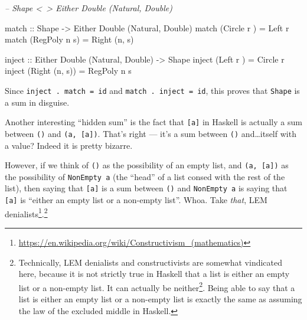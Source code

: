 \documentclass[]{article}
\newenvironment{Shaded}{}{}
\newcommand{\CommentTok}[1]{\textcolor[rgb]{0.38,0.63,0.69}{\textit{#1}}}
\newcommand{\DataTypeTok}[1]{\textcolor[rgb]{0.56,0.13,0.00}{#1}}
\newcommand{\FunctionTok}[1]{\textcolor[rgb]{0.02,0.16,0.49}{#1}}
\newcommand{\NormalTok}[1]{#1}
\newcommand{\OtherTok}[1]{\textcolor[rgb]{0.00,0.44,0.13}{#1}}
\renewcommand{\href}[2]{#2\footnote{\url{#1}}}
\begin{document}
\begin{Shaded}
\begin{Highlighting}[]
\CommentTok{-- Shape <~> Either Double (Natural, Double)}

\OtherTok{match ::} \DataTypeTok{Shape} \OtherTok{->} \DataTypeTok{Either} \DataTypeTok{Double}\NormalTok{ (}\DataTypeTok{Natural}\NormalTok{, }\DataTypeTok{Double}\NormalTok{)}
\NormalTok{match (}\DataTypeTok{Circle}\NormalTok{  r  ) }\FunctionTok{=} \DataTypeTok{Left}\NormalTok{ r}
\NormalTok{match (}\DataTypeTok{RegPoly}\NormalTok{ n s) }\FunctionTok{=} \DataTypeTok{Right}\NormalTok{ (n, s)}

\OtherTok{inject ::} \DataTypeTok{Either} \DataTypeTok{Double}\NormalTok{ (}\DataTypeTok{Natural}\NormalTok{, }\DataTypeTok{Double}\NormalTok{) }\OtherTok{->} \DataTypeTok{Shape}
\NormalTok{inject (}\DataTypeTok{Left}\NormalTok{   r    ) }\FunctionTok{=} \DataTypeTok{Circle}\NormalTok{  r}
\NormalTok{inject (}\DataTypeTok{Right}\NormalTok{ (n, s)) }\FunctionTok{=} \DataTypeTok{RegPoly}\NormalTok{ n s}
\end{Highlighting}
\end{Shaded}

Since \texttt{inject\ .\ match\ =\ id} and \texttt{match\ .\ inject\ =\ id},
this proves that \texttt{Shape} is a sum in disguise.

Another interesting ``hidden sum'' is the fact that \texttt{{[}a{]}} in Haskell
is actually a sum between \texttt{()} and \texttt{(a,\ {[}a{]})}. That's right
--- it's a sum between \texttt{()} and\ldots{}itself with a value? Indeed it is
pretty bizarre.

However, if we think of \texttt{()} as the possibility of an empty list, and
\texttt{(a,\ {[}a{]})} as the possibility of \texttt{NonEmpty\ a} (the ``head''
of a list consed with the rest of the list), then saying that \texttt{{[}a{]}}
is a sum between \texttt{()} and \texttt{NonEmpty\ a} is saying that
\texttt{{[}a{]}} is ``either an empty list or a non-empty list''. Whoa. Take
\emph{that},
\href{https://en.wikipedia.org/wiki/Constructivism_(mathematics)}{LEM
denialists}.\footnote{Technically, LEM denialists and constructivists are
  somewhat vindicated here, because it is not strictly true in Haskell that a
  list is either an empty list or a non-empty list. It can actually
  \href{https://wiki.haskell.org/Bottom}{be neither}. Being able to say that a
  list is either an empty list or a non-empty list is exactly the same as
  assuming the law of the excluded middle in Haskell.}
\end{document}

